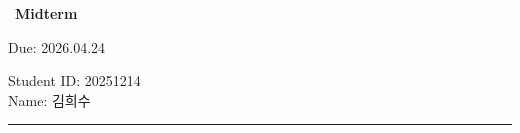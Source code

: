 \providecommand{\hwtitle}{Midterm}
\providecommand{\hwduedate}{2026.04.24}
\providecommand{\studentid}{20251214}
\providecommand{\studentname}{김희수}

\begin{center}
    \Large~\textbf{\hwtitle}
\end{center}

\vspace{0.4cm}

\noindent
\begin{minipage}[t]{0.5\textwidth}
Due: \hwduedate
\end{minipage}
\begin{minipage}[t]{0.5\textwidth}
    \begin{flushright}
    Student ID: \studentid\\
    Name: \studentname
    \end{flushright}
\end{minipage}

\vspace{0.4cm}
\noindent\rule{\textwidth}{0.4pt}
